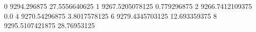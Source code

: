 0 9294.296875 27.5556640625
1 9267.5205078125 0.779296875
2 9266.7412109375 0.0
4 9270.54296875 3.8017578125
6 9279.4345703125 12.693359375
8 9295.5107421875 28.76953125
